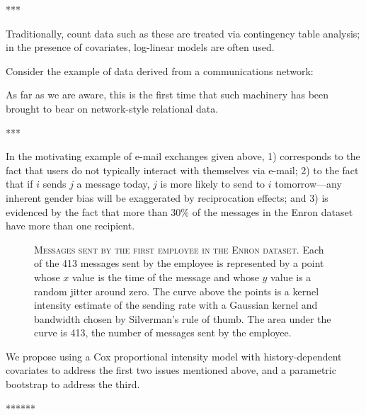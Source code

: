 \documentclass[aoas,preprint]{imsart}
\begin{document}
***

Traditionally, count data such as these are treated via contingency table analysis; in the presence of covariates, log-linear models are often used.

Consider the example of data derived from a communications network:

As far as we are aware, this is the first time that such machinery has been brought to bear on network-style relational data.

***

In the motivating example of e-mail exchanges given above, 1) corresponds to the fact that users do not typically interact with themselves via e-mail; 2) to the fact that if $i$ sends $j$ a message today, $j$ is more likely to send to $i$ tomorrow---any inherent gender bias will be exaggerated by reciprocation effects; and 3) is evidenced by the fact that more than 30\% of the messages in the Enron dataset have more than one recipient.


\begin{figure}
    \caption{
        \textsc{Messages sent by the first employee in the Enron dataset.}
        Each of the 413 messages sent by the employee is represented by a point
        whose $x$ value is the time of the message and whose $y$ value is a
        random jitter around zero.  The curve above the points is a kernel
        intensity estimate of the sending rate with a Gaussian kernel
        and bandwidth chosen by Silverman's rule of thumb.  The area
        under the curve is 413, the number of messages sent by the
        employee.
    }
    \label{F:kernel-intensity}
\end{figure}

We propose using a Cox proportional intensity model with history-dependent
covariates to address the first two issues mentioned above, and a parametric
bootstrap to address the third.

******
\end{document}
